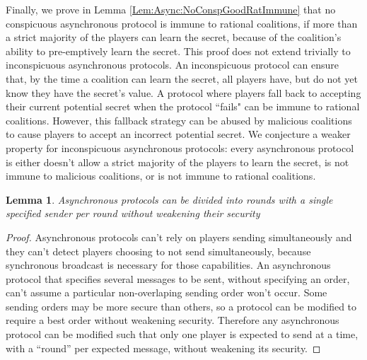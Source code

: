 \documentclass{dalcsthesis}
\newtheorem{lemma}{Lemma}
\begin{document}
Finally, we prove in Lemma \ref{Lem:Async:NoConspGoodRatImmune} that no conspicuous asynchronous protocol is immune to rational coalitions, if more than a strict majority of the players can learn the secret, because of the coalition's ability to pre-emptively learn the secret. This proof does not extend trivially to inconspicuous asynchronous protocols. An inconspicuous protocol can ensure that, by the time a coalition can learn the secret, all players have, but do not yet know they have the secret's value. A protocol where players fall back to accepting their current potential secret when the protocol ``fails" can be immune to rational coalitions. However, this fallback strategy can be abused by malicious coalitions to cause players to accept an incorrect potential secret. We conjecture a weaker property for inconspicuous asynchronous protocols: every asynchronous protocol is either doesn't allow a strict majority of the players to learn the secret, is not immune to malicious coalitions, or is not immune to rational coalitions.

\begin{lemma} Asynchronous protocols can be divided into rounds with a single specified sender per round without weakening their security \label{Lem:Async:Roundable} \end{lemma}
\begin{proof}
Asynchronous protocols can't rely on players sending simultaneously and they can't detect players choosing to not send simultaneously, because synchronous broadcast is necessary for those capabilities. An asynchronous protocol that specifies several messages to be sent, without specifying an order, can't assume a particular non-overlaping sending order won't occur. Some sending orders may be more secure than others, so a protocol can be modified to require a best order without weakening security. Therefore any asynchronous protocol can be modified such that only one player is expected to send at a time, with a ``round'' per expected message, without weakening its security.
\end{proof}
\end{document}
